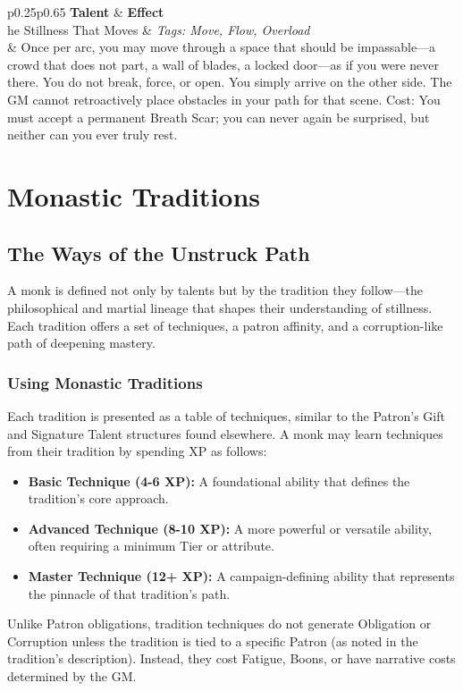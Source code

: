 \documentclass[11pt]{book}
\newenvironment{traittable}[1]
  {\begin{supertabular}{p{0.25\linewidth}p{0.65\linewidth}} \hline \textbf{Talent} & \textbf{Effect} \\ \hline}
  {\end{supertabular}}
\begin{document}
\begin{traittable}
The Stillness That Moves & \textit{Tags: Move, Flow, Overload} \\
& Once per arc, you may move through a space that should be impassable---a crowd that does not part, a wall of blades, a locked door---as if you were never there. You do not break, force, or open. You simply arrive on the other side. The GM cannot retroactively place obstacles in your path for that scene. Cost: You must accept a permanent Breath Scar; you can never again be surprised, but neither can you ever truly rest.
\end{traittable}

\part{Monastic Traditions}

\chapter{The Ways of the Unstruck Path}

A monk is defined not only by talents but by the tradition they follow---the philosophical and martial lineage that shapes their understanding of stillness. Each tradition offers a set of techniques, a patron affinity, and a corruption-like path of deepening mastery.

\section{Using Monastic Traditions}

Each tradition is presented as a table of techniques, similar to the Patron's Gift and Signature Talent structures found elsewhere. A monk may learn techniques from their tradition by spending XP as follows:

\begin{itemize}
    \item \textbf{Basic Technique (4-6 XP):} A foundational ability that defines the tradition's core approach.
    \item \textbf{Advanced Technique (8-10 XP):} A more powerful or versatile ability, often requiring a minimum Tier or attribute.
    \item \textbf{Master Technique (12+ XP):} A campaign-defining ability that represents the pinnacle of that tradition's path.
\end{itemize}

Unlike Patron obligations, tradition techniques do not generate Obligation or Corruption unless the tradition is tied to a specific Patron (as noted in the tradition's description). Instead, they cost Fatigue, Boons, or have narrative costs determined by the GM.
\end{document}

